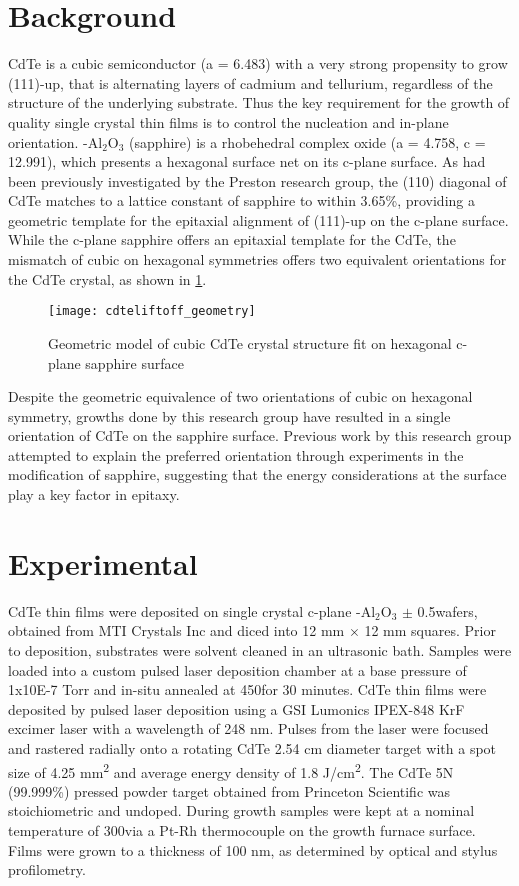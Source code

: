 \section{Background}
CdTe is a cubic semiconductor (a = 6.483) with a very strong propensity to grow 
(111)-up, that is 
alternating layers of cadmium and tellurium, regardless of the structure of the 
underlying substrate. Thus the key requirement for the growth of quality single crystal 
thin films is to control the nucleation and in-plane orientation. \textalpha-Al$_2$O$_3$ 
(sapphire) 
is a rhobehedral complex oxide (a = 4.758, c = 12.991), which presents a hexagonal surface net 
on its c-plane surface. As had been previously investigated by the Preston research 
group, the (110) diagonal of CdTe matches to a lattice constant of sapphire to within 
3.65\%, providing a geometric template for the epitaxial alignment of (111)-up on the 
c-plane surface. While the c-plane sapphire offers an epitaxial template for the CdTe, 
the mismatch of cubic on hexagonal symmetries offers two equivalent orientations for the 
CdTe crystal, as shown in \cref{fig:cdteliftoff_geometry}.
\begin{figure}
    \centering
    \texttt{[image: cdteliftoff\_geometry]}
    \caption{\label{fig:cdteliftoff_geometry}Geometric model of cubic CdTe crystal 
    structure fit on hexagonal c-plane sapphire surface}
\end{figure}
Despite the geometric equivalence of two orientations of cubic on hexagonal symmetry, 
growths done by this research group have resulted in a single orientation of CdTe on the 
sapphire surface. Previous work by this research group attempted to explain the preferred 
orientation through experiments in the modification of sapphire\cite{Neretina2009b}, 
suggesting that the energy considerations at the surface play a key factor in epitaxy.
\section{Experimental}
CdTe thin films were deposited on single crystal c-plane \textalpha-Al$_2$O$_3$ $\pm$ 
0.5\degree wafers, obtained from MTI Crystals Inc and diced into 12 mm $\times$ 12 mm 
squares. Prior to deposition, substrates were solvent cleaned in an ultrasonic bath. 
Samples were loaded into a custom pulsed laser deposition chamber at a base pressure of 
1x10E-7 Torr and in-situ annealed at 450\degree\celsius for 30 minutes. CdTe thin films 
were deposited by pulsed laser deposition using a GSI Lumonics IPEX-848 KrF excimer laser 
with a wavelength of 248 nm. Pulses from the laser were focused and rastered radially 
onto a rotating CdTe 2.54 cm diameter target with a spot size of 4.25 
mm\textsuperscript{2} and average 
energy density of 1.8 J/cm\textsuperscript{2}. The CdTe 5N (99.999\%) pressed powder 
target obtained from 
Princeton Scientific was stoichiometric and undoped. During growth samples were kept at a 
nominal temperature of 300\degree\celsius via a Pt-Rh thermocouple on the growth furnace 
surface. 
Films were grown to a thickness of 100 nm, as determined by optical and stylus 
profilometry.

